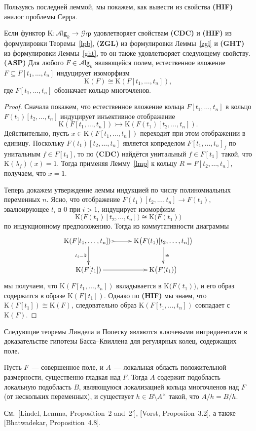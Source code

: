 \documentclass[oneside, 11pt]{amsart}
\begin{document}
Пользуясь последней леммой, мы покажем, как вывести из свойства {\bf(HIF)} аналог проблемы Серра.
\begin{lemma}
\label{asp}
Если функтор $\mathrm K\colon\mathcal A\mathsf{lg}_k\rightarrow\mathcal G\mathsf{rp}$ удовлетворяет свойствам {\bf(CDC)} и {\bf(HIF)} из формулировки Теоремы~\ref{lpb}, {\bf(ZGL)} из формулировки Леммы~\ref{zgl} и {\bf(GHT)} из формулировки Леммы~\ref{ght}, то он также удовлетворяет следующему свойству.\\
{\bf(ASP)} Для любого $F\in\mathcal A\mathsf{lg}_k$ являющейся полем, естественное вложение $F\subseteq F[t_1,\ldots,t_n]$ индуцирует изоморфизм
$$
\mathrm K(F)\cong\mathrm K(F[t_1,\ldots,t_n]),
$$
где $F[t_1,\ldots,t_n]$ обозначает кольцо многочленов.
\end{lemma}
\begin{proof}
Сначала покажем, что естественное вложение кольца $F[t_1,\ldots,t_n]$ в кольцо $F(t_1)[t_2,\ldots,t_n]$ индуцирует инъективное отображение
$$
\mathrm K(F[t_1,\ldots,t_n])\rightarrowtail\mathrm K(F(t_1)[t_2,\ldots,t_n]).
$$
Действительно, пусть $x\in\mathrm K(F[t_1,\ldots,t_n])$ переходит при этом отображении в единицу. Поскольку $F(t_1)[t_2,\ldots,t_n]$ является копределом $F[t_1,\ldots,t_n]_f$ по унитальным $f\in F[t_1]$, то по {\bf(CDC)} найдётся унитальный $f\in F[t_1]$ такой, что $\mathrm K(\lambda_f)(x)=1$. Тогда применяя Лемму~\ref{lmp} к кольцу $R=F[t_2,\ldots,t_n]$, получаем, что $x=1$. 

Теперь докажем утверждение леммы индукцией по числу полиномиальных переменных $n$. Ясно, что отображение $F(t_1)[t_2,\ldots,t_n]\rightarrow F(t_1)$, эвалюирующее $t_i$ в $0$ при $i>1$, индуцирует изоморфизм
$$
\mathrm K\big(F(t_1)[t_2,\ldots,t_n]\big)\cong\mathrm K\big(F(t_1)\big)
$$
по индукционному предположению. Тогда из коммутативности диаграммы
$$
\xymatrix{
\mathrm K(F[t_1,\ldots,t_n])\ \ar@{>->}[r]\ar[d]_{t_i=0}&\mathrm K\big(F(t_1)[t_2,\ldots,t_n]\big)\ar[d]^{\cong}\\
\mathrm K(F[t_1])\ar[r]&\mathrm K\big(F(t_1)\big)
}
$$
мы получаем, что $\mathrm K(F[t_1,\ldots,t_n])$ вкладывается в $\mathrm K\big(F(t_1)\big)$, и его образ содержится в образе $\mathrm K(F[t_1])$. Однако по {\bf(HIF)} мы знаем, что $\mathrm K(F[t_1])\cong\mathrm K(F)$, следовательно образ $\mathrm K(F[t_1,\ldots,t_n])$ совпадает с $\mathrm K(F)$.
\end{proof}

Следующие теоремы Линдела и Попеску являются ключевыми ингридиентами в доказательстве гипотезы Басса--Квиллена для регулярных колец, содержащих поле. 
\begin{theorem}[Lindel]
\label{lindel}
Пусть $F$~--- совершенное поле, и $A$~--- локальная область положительной размерности, существенно гладкая над $F$. Тогда $A$ содержит подобласть локальную подобласть $B$, являющуюся локализацией кольца многочленов над $F$ {\rm(}от нескольких переменных{\rm)}, и существует $h\in B\setminus A^\times$ такой, что $A/h=B/h$. 
\end{theorem}
См.~[Lindel, Lemma, Proposition~2 and~2'], [Vorst, Proposiion~3.2], а также [Bhatwadekar, Proposition~4.8].
\end{document}
